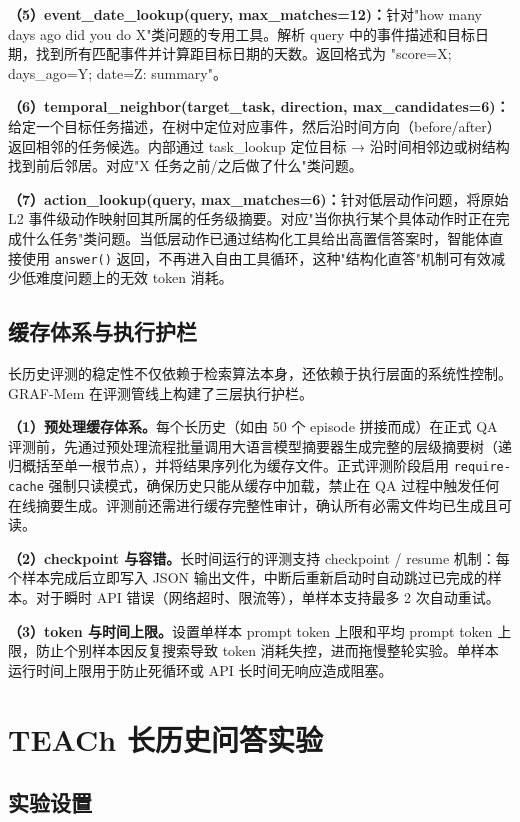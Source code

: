 \textbf{（5）event\_date\_lookup(query, max\_matches=12)：}针对"how many days ago did you do X"类问题的专用工具。解析 query 中的事件描述和目标日期，找到所有匹配事件并计算距目标日期的天数。返回格式为 "score=X; days\_ago=Y; date=Z: summary"。

\textbf{（6）temporal\_neighbor(target\_task, direction, max\_candidates=6)：}给定一个目标任务描述，在树中定位对应事件，然后沿时间方向（before/after）返回相邻的任务候选。内部通过 task\_lookup 定位目标 → 沿时间相邻边或树结构找到前后邻居。对应"X 任务之前/之后做了什么"类问题。

\textbf{（7）action\_lookup(query, max\_matches=6)：}针对低层动作问题，将原始 L2 事件级动作映射回其所属的任务级摘要。对应"当你执行某个具体动作时正在完成什么任务"类问题。当低层动作已通过结构化工具给出高置信答案时，智能体直接使用 \texttt{answer()} 返回，不再进入自由工具循环，这种"结构化直答"机制可有效减少低难度问题上的无效 token 消耗。

\subsection{缓存体系与执行护栏}

长历史评测的稳定性不仅依赖于检索算法本身，还依赖于执行层面的系统性控制。GRAF-Mem 在评测管线上构建了三层执行护栏。

\textbf{（1）预处理缓存体系。}每个长历史（如由 50 个 episode 拼接而成）在正式 QA 评测前，先通过预处理流程批量调用大语言模型摘要器生成完整的层级摘要树（递归概括至单一根节点），并将结果序列化为缓存文件。正式评测阶段启用 \texttt{require-cache} 强制只读模式，确保历史只能从缓存中加载，禁止在 QA 过程中触发任何在线摘要生成。评测前还需进行缓存完整性审计，确认所有必需文件均已生成且可读。

\textbf{（2）checkpoint 与容错。}长时间运行的评测支持 checkpoint / resume 机制：每个样本完成后立即写入 JSON 输出文件，中断后重新启动时自动跳过已完成的样本。对于瞬时 API 错误（网络超时、限流等），单样本支持最多 2 次自动重试。

\textbf{（3）token 与时间上限。}设置单样本 prompt token 上限和平均 prompt token 上限，防止个别样本因反复搜索导致 token 消耗失控，进而拖慢整轮实验。单样本运行时间上限用于防止死循环或 API 长时间无响应造成阻塞。

\section{TEACh 长历史问答实验}

\subsection{实验设置}


